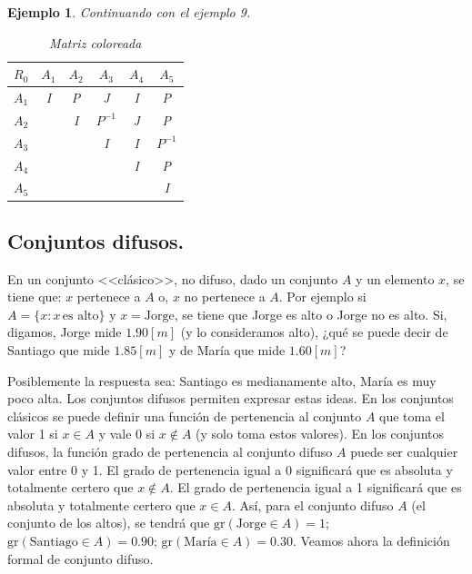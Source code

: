 \documentclass[a5paper,doc,10pt,noapacite]{apa6}
\newtheorem{ejem}{Ejemplo}
\begin{document}
{{\newpage

\begin{ejem} Continuando con el ejemplo 9.

\begin{table}[H]
   \fontsize{7}{11}\selectfont
   	\captionsetup{justification=centering, labelfont=footnotesize, font=footnotesize}
    \centering
	\begin{tabular}{c|ccccc} \thickline
	\(R_0\) & \(A_1\) & \(A_2\) & \(A_3\) & \(A_4\) & \(A_5\)  \\ \hline
    \(A_1\) & \cellcolor{pastelyellow} I & \cellcolor{paleblue} P & \cellcolor{pastelgray}J & \cellcolor{pastelyellow} I & \cellcolor{paleblue} P  \\
    \(A_2\) &  & \cellcolor{pastelyellow} I & \cellcolor{palegreen} \(P^{-1}\) & \cellcolor{pastelgray}J & \cellcolor{paleblue} P  \\
	\(A_3\) &  &  & \cellcolor{pastelyellow} I & \cellcolor{pastelyellow} I & \cellcolor{palegreen} \(P^{-1} \)  \\
	\(A_4\) &  &  &  & \cellcolor{pastelyellow} I & \cellcolor{paleblue} P   \\
	\(A_5\) &  &  &  &  & \cellcolor{pastelyellow}I   \\
    \end{tabular}
    \caption*{Matriz coloreada}
\label{tab:B4} 
\end{table}
\end{ejem}

	\subsection{Conjuntos difusos.}

En un conjunto <<clásico>>, no difuso, dado un conjunto \(A\) y un elemento \(x\), se tiene que: \(x\) pertenece a \(A\) o, \(x\) no pertenece a \(A\). Por ejemplo si \(A = \{x : x \, \text{es alto}\}\) y \(x = \text{Jorge}\), se tiene que Jorge es alto o Jorge no es alto. Si, digamos, Jorge mide \(1.90 [m]\) (y lo consideramos alto), ¿qué se puede decir de Santiago que mide \(1.85 [m]\) y de María que mide \(1.60[m]\)?

Posiblemente la respuesta sea: Santiago es medianamente alto, María es muy poco alta. Los conjuntos difusos permiten expresar estas ideas. En los conjuntos clásicos se puede definir una función de pertenencia al conjunto \(A\) que toma el valor 1 si \(x \in A\) y vale 0 si \(x \not \in A\) (y solo toma estos valores). En los conjuntos difusos, la función grado de pertenencia al conjunto difuso \(A\) puede ser cualquier valor entre 0 y 1. El grado de pertenencia igual a 0 significará que es absoluta y totalmente certero que \(x \not \in A\). El grado de pertenencia igual a 1 significará que es absoluta y totalmente certero que \(x \in A\). Así, para el conjunto difuso \(A\) (el conjunto de los altos), se tendrá que \(\text{gr}(\text{Jorge} \in A) = 1\); \(\text{gr}(\text{Santiago} \in A) = 0.90\); \(\text{gr}(\text{María} \in A) = 0.30\). Veamos ahora la definición formal de conjunto difuso. 

}}
\end{document}
